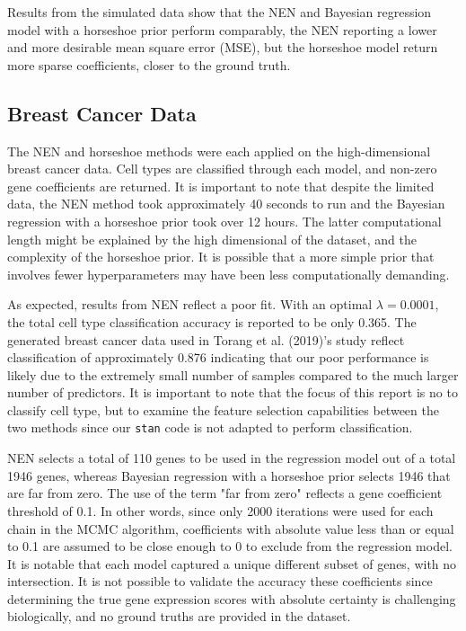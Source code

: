 \documentclass[
	a4paper, %
	10pt, %
	unnumberedsections, %
	twoside, %
]{LTJournalArticle}
\newcommand{\1}{\mathbbm{1}}
\begin{document}
Results from the simulated data show that the NEN and Bayesian regression model with a horseshoe prior perform comparably, the NEN reporting a lower and more desirable mean square error (MSE), but the horseshoe model return more sparse coefficients, closer to the ground truth.


\subsection{Breast Cancer Data}

The NEN and horseshoe methods were each applied on the high-dimensional breast cancer data. Cell types are classified through each model, and non-zero gene coefficients are returned. It is important to note that despite the limited data, the NEN method took approximately 40 seconds to run and the Bayesian regression with a horseshoe prior took over 12 hours. The latter computational length might be explained by the high dimensional of the dataset, and the complexity of the horseshoe prior. It is possible that a more simple prior that involves fewer hyperparameters may have been less computationally demanding. 


As expected, results from NEN reflect a poor fit. With an optimal $\lambda = 0.0001$, the total cell type classification accuracy is reported to be only 0.365. The generated breast cancer data used in Torang et al. (2019)'s study reflect classification of approximately 0.876 indicating that our poor performance is likely due to the extremely small number of samples compared to the much larger number of predictors. It is important to note that the focus of this report is no to classify cell type, but to examine the feature selection capabilities between the two methods since our \verb|stan| code is not adapted to perform classification. 

NEN selects a total of 110 genes to be used in the regression model out of a total 1946 genes, whereas Bayesian regression with a horseshoe prior selects 1946 that are far from zero. The use of the term "far from zero" reflects a gene coefficient threshold of 0.1. In other words, since only 2000 iterations were used for each chain in the MCMC algorithm, coefficients with absolute value less than or equal to 0.1 are assumed to be close enough to 0 to exclude from the regression model. It is notable that each model captured a unique different subset of genes, with no intersection. It is not possible to validate the accuracy these coefficients since determining the true gene expression scores with absolute certainty is challenging biologically, and no ground truths are provided in the dataset. 
\end{document}
